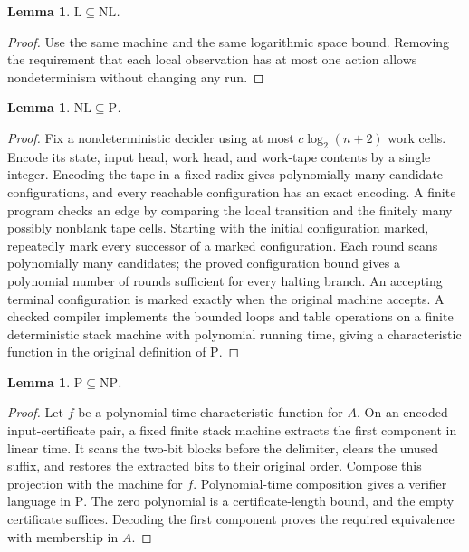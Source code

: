 \documentclass[11pt]{article}
\newtheorem{lemma}[theorem]{Lemma}
\theoremstyle{definition}
\begin{document}
\begin{lemma}\leavevmode
$\mathrm L\subseteq\mathrm{NL}$.
\end{lemma}

\begin{proof}\leavevmode
Use the same machine and the same logarithmic space bound. Removing the requirement that each local observation has at most one action allows nondeterminism without changing any run.
\qedhere
\end{proof}

\begin{lemma}\leavevmode
$\mathrm{NL}\subseteq\mathrm P$.
\end{lemma}

\begin{proof}\leavevmode
Fix a nondeterministic decider using at most $c\log_2(n+2)$ work cells.
Encode its state, input head, work head, and work-tape contents by a single
integer. Encoding the tape in a fixed radix gives polynomially many
candidate configurations, and every reachable configuration has an exact
encoding. A finite program checks an edge by comparing the local transition
and the finitely many possibly nonblank tape cells. Starting with the
initial configuration marked, repeatedly mark every successor of a marked
configuration. Each round scans polynomially many candidates; the proved
configuration bound gives a polynomial number of rounds sufficient for every
halting branch. An accepting terminal configuration is marked exactly when
the original machine accepts. A checked compiler implements the bounded
loops and table operations on a finite deterministic stack machine with
polynomial running time, giving a characteristic function in the original
definition of $\mathrm P$.
\qedhere
\end{proof}

\begin{lemma}\leavevmode
$\mathrm P\subseteq\mathrm{NP}$.
\end{lemma}

\begin{proof}\leavevmode
Let $f$ be a polynomial-time characteristic function for $A$. On an encoded input-certificate pair, a fixed finite stack machine extracts the first component in linear time. It scans the two-bit blocks before the delimiter, clears the unused suffix, and restores the extracted bits to their original order. Compose this projection with the machine for $f$. Polynomial-time composition gives a verifier language in $\mathrm P$. The zero polynomial is a certificate-length bound, and the empty certificate suffices. Decoding the first component proves the required equivalence with membership in $A$.
\qedhere
\end{proof}
\end{document}
